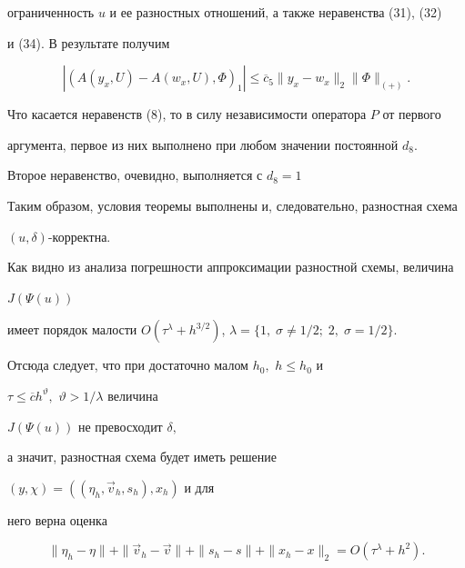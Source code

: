 ограниченность $u$ и ее разностных отношений, а также неравенства (31), (32) 


и (34). В результате получим 


$$ 


|(A(y_x,U)-A(w_x,U),\Phi)_1| \le \overline c_5\|y_x-w_x\|_2 


\|\Phi\|_{(+)}. 


$$ 


Что касается неравенств (8), то в силу независимости оператора $P$ от первого 


аргумента, первое из них выполнено при любом значении постоянной $d_8.$ 


Второе неравенство, очевидно, выполняется с $d_8=1$ 


 


Таким образом, условия теоремы выполнены и, следовательно, разностная схема 


$(u,\delta)$-корректна. 


 


Как видно из анализа погрешности аппроксимации разностной схемы, величина  


$J(\Psi(u))$ 


имеет порядок малости $O(\tau^\lambda+h^{3/2})$, $\lambda=\{1,\;\sigma\ne 1/2; 


\;2,\;\sigma=1/2\}.$ 


Отсюда следует, что при достаточно малом $h_0,$ $h\le h_0$ и 


$\tau\le \overline c h^\vartheta,$ $\vartheta>1/\lambda$ величина 


$J(\Psi(u))$ не превосходит $\delta,$ 


а значит, разностная схема будет иметь решение  


$(y,\chi)=((\eta_h,\Vec v_h,s_h),x_h)$ и для 


него верна оценка 


$$ 


\|\eta_h-\eta\|+\|\Vec v_h-\Vec v\|+ \|s_h-s\|+ 


 \|x_h-x\|_2 =O(\tau^\lambda +h^2). 


$$ 


 


